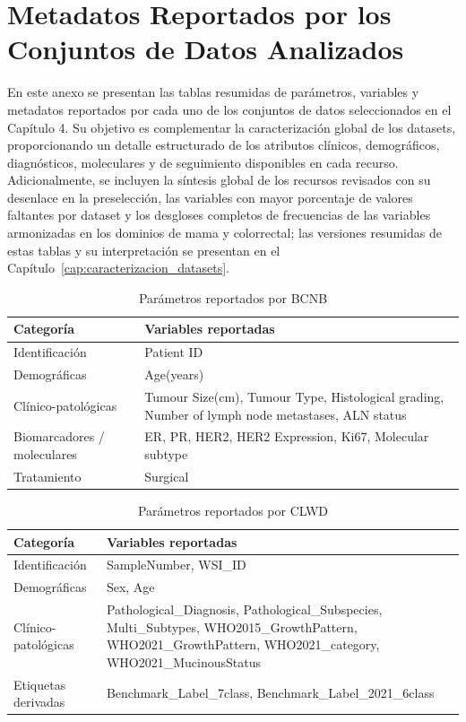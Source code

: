 \chapter{Metadatos Reportados por los Conjuntos de Datos Analizados}
\label{appendix:tablasdatasets}

En este anexo se presentan las tablas resumidas de parámetros, variables y metadatos reportados por cada uno de los conjuntos de datos seleccionados en el Capítulo 4. Su objetivo es complementar la caracterización global de los datasets, proporcionando un detalle estructurado de los atributos clínicos, demográficos, diagnósticos, moleculares y de seguimiento disponibles en cada recurso. Adicionalmente, se incluyen la síntesis global de los recursos revisados con su desenlace en la preselección, las variables con mayor porcentaje de valores faltantes por dataset y los desgloses completos de frecuencias de las variables armonizadas en los dominios de mama y colorrectal; las versiones resumidas de estas tablas y su interpretación se presentan en el Capítulo~\ref{cap:caracterizacion_datasets}.

\begin{table}[ht]
\centering
\caption{Parámetros reportados por BCNB}
\label{tab:parametros_bcnb}
\renewcommand{\arraystretch}{1.2}
\begin{tabularx}{\textwidth}{lX}
\toprule
\textbf{Categoría} & \textbf{Variables reportadas} \\
\midrule
Identificación & Patient ID \\
Demográficas & Age(years) \\
Clínico-patológicas & Tumour Size(cm), Tumour Type, Histological grading, Number of lymph node metastases, ALN status \\
Biomarcadores / moleculares & ER, PR, HER2, HER2 Expression, Ki67, Molecular subtype \\
Tratamiento & Surgical \\
\bottomrule
\end{tabularx}
\end{table}

\begin{table}[ht]
\centering
\caption{Parámetros reportados por CLWD}
\label{tab:parametros_clwd}
\renewcommand{\arraystretch}{1.2}
\begin{tabularx}{\textwidth}{lX}
\toprule
\textbf{Categoría} & \textbf{Variables reportadas} \\
\midrule
Identificación & SampleNumber, WSI\_ID \\
Demográficas & Sex, Age \\
Clínico-patológicas & Pathological\_Diagnosis, Pathological\_Subspecies, Multi\_Subtypes, WHO2015\_GrowthPattern, WHO2021\_GrowthPattern, WHO2021\_category, WHO2021\_MucinousStatus \\
Etiquetas derivadas & Benchmark\_Label\_7class, Benchmark\_Label\_2021\_6class \\
\bottomrule
\end{tabularx}
\end{table}

